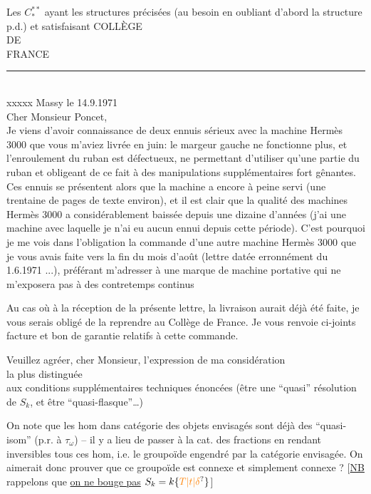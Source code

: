 Les $C_*^{**}$ ayant les structures précisées (au besoin en oubliant d'abord la structure p.d.) et satisfaisant
COLLÈGE\\
DE\\
FRANCE\\
\rule{1em}{.4pt}\\
xxxxx Massy le 14.9.1971\\
Cher Monsieur Poncet,\\
Je viens d'avoir connaissance de deux ennuis sérieux avec la machine Hermès 3000 que vous m'aviez livrée en juin: le margeur gauche ne fonctionne plus, et l'enroulement du ruban est défectueux, ne permettant d'utiliser qu'une partie du ruban et obligeant de ce fait à des manipulations supplémentaires fort gênantes. Ces ennuis se présentent alors que la machine a encore à peine servi (une trentaine de pages de texte environ), et il est clair que la qualité des machines Hermès 3000 a considérablement baissée depuis une dizaine d'années (j'ai une machine avec laquelle je n'ai eu aucun ennui depuis cette période). C'est pourquoi je me vois dans l'obligation  la commande d'une autre machine Hermès 3000 que je vous avais faite vers la fin du mois d'août (lettre datée erronnément du 1.6.1971 ...), préférant m'adresser à une marque de machine portative qui ne m'exposera pas à des contretemps continus

Au cas où à la réception de la présente lettre, la livraison aurait déjà été faite, je vous serais obligé de la reprendre au Collège de France. Je vous renvoie ci-joints facture et bon de garantie relatifs à cette commande.

Veuillez agréer, cher Monsieur, l'expression de ma considération\\
la plus distinguée\\
aux conditions supplémentaires techniques énoncées (être une ``quasi'' résolution de $S_k$, et être ``quasi-flasque''\ldots)

On note que les hom dans   catégorie des objets  envisagés sont déjà des ``quasi-isom'' (p.r. à $\tau_\omega$) -- il y a lieu de passer à la cat. des fractions en  rendant inversibles tous ces hom,  i.e. le groupoïde engendré par la catégorie envisagée. On aimerait donc prouver que ce groupoïde est connexe et simplement connexe ? [\uline{NB} rappelons que  \uline{on ne bouge pas}  $S_k=k\{\unsure{T|t|\delta}\}$]

